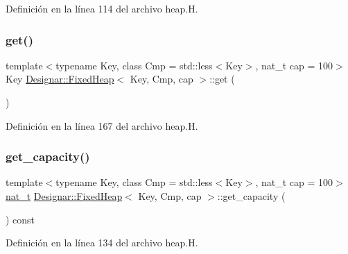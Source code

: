 Definición en la línea 114 del archivo heap.\+H.

\mbox{\label{class_designar_1_1_fixed_heap_a0a274fa702d084e555b917b04ee73b37}} 
\subsubsection{\texorpdfstring{get()}{get()}}
{\footnotesize\ttfamily template$<$typename Key, class Cmp = std\+::less$<$\+Key$>$, nat\+\_\+t cap = 100$>$ \\
Key \hyperlink{class_designar_1_1_fixed_heap}{Designar\+::\+Fixed\+Heap}$<$ Key, Cmp, cap $>$\+::get (\begin{DoxyParamCaption}{ }\end{DoxyParamCaption})\hspace{0.3cm}{\ttfamily [inline]}}



Definición en la línea 167 del archivo heap.\+H.

\mbox{\label{class_designar_1_1_fixed_heap_a6f2b6bb5de9abd4718f07eb1261bee92}} 
\subsubsection{\texorpdfstring{get\+\_\+capacity()}{get\_capacity()}}
{\footnotesize\ttfamily template$<$typename Key, class Cmp = std\+::less$<$\+Key$>$, nat\+\_\+t cap = 100$>$ \\
\hyperlink{namespace_designar_aa72662848b9f4815e7bf31a7cf3e33d1}{nat\+\_\+t} \hyperlink{class_designar_1_1_fixed_heap}{Designar\+::\+Fixed\+Heap}$<$ Key, Cmp, cap $>$\+::get\+\_\+capacity (\begin{DoxyParamCaption}{ }\end{DoxyParamCaption}) const\hspace{0.3cm}{\ttfamily [inline]}}



Definición en la línea 134 del archivo heap.\+H.

\mbox{\label{class_designar_1_1_fixed_heap_a29db925edd7d26a8cd6f8ee970e70b53}} 
